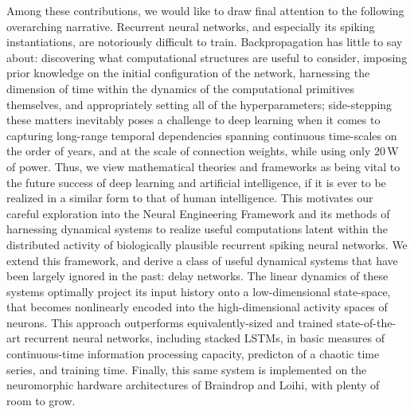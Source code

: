 Among these contributions, we would like to draw final attention to the following overarching narrative.
Recurrent neural networks, and especially its spiking instantiations, are notoriously difficult to train.
Backpropagation has little to say about: discovering what computational structures are useful to consider, imposing prior knowledge on the initial configuration of the network, harnessing the dimension of time within the dynamics of the computational primitives themselves, and appropriately setting all of the hyperparameters; side-stepping these matters inevitably poses a challenge to deep learning when it comes to capturing long-range temporal dependencies spanning continuous time-scales on the order of years, and at the scale of  connection weights, while using only $20$\,W of power.
Thus, we view mathematical theories and frameworks as being vital to the future success of deep learning and artificial intelligence, if it is ever to be realized in a similar form to that of human intelligence.
This motivates our careful exploration into the Neural Engineering Framework and its methods of harnessing dynamical systems to realize useful computations latent within the distributed activity of biologically plausible recurrent spiking neural networks.
We extend this framework, and derive a class of useful dynamical systems that have been largely ignored in the past: delay networks.
The linear dynamics of these systems optimally project its input history onto a low-dimensional state-space, that becomes nonlinearly encoded into the high-dimensional activity spaces of neurons.
This approach outperforms equivalently-sized and trained state-of-the-art recurrent neural networks, including stacked LSTMs, in basic measures of continuous-time information processing capacity, predicton of a chaotic time series, and training time.
Finally, this same system is implemented on the neuromorphic hardware architectures of Braindrop and Loihi, with plenty of room to grow.


